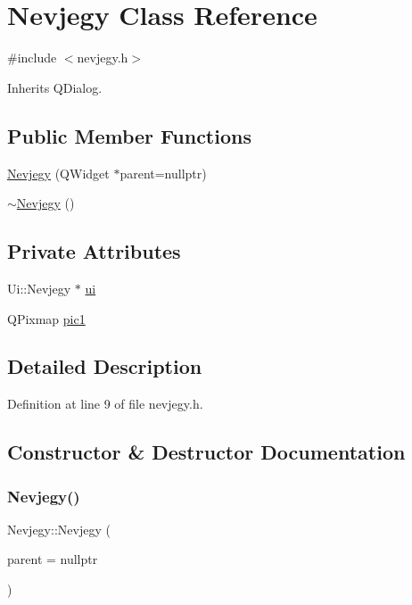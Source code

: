 \hypertarget{classNevjegy}{}\section{Nevjegy Class Reference}
\label{classNevjegy}


{\ttfamily \#include $<$nevjegy.\+h$>$}



Inherits Q\+Dialog.

\subsection*{Public Member Functions}
\begin{DoxyCompactItemize}
\item 
\hyperlink{classNevjegy_abd3f15b023f39e48ef5d79c384bea1d1}{Nevjegy} (Q\+Widget $\ast$parent=nullptr)
\item 
\hyperlink{classNevjegy_a9521f7b858472228b5b8d39438b67432}{$\sim$\+Nevjegy} ()
\end{DoxyCompactItemize}
\subsection*{Private Attributes}
\begin{DoxyCompactItemize}
\item 
Ui\+::\+Nevjegy $\ast$ \hyperlink{classNevjegy_ad971d94faab06f49928fb7f0b844105f}{ui}
\item 
Q\+Pixmap \hyperlink{classNevjegy_a4d025918cbecfe2da5184b98e63501df}{pic1}
\end{DoxyCompactItemize}


\subsection{Detailed Description}


Definition at line 9 of file nevjegy.\+h.



\subsection{Constructor \& Destructor Documentation}
\mbox{\label{classNevjegy_abd3f15b023f39e48ef5d79c384bea1d1}} 
\subsubsection{\texorpdfstring{Nevjegy()}{Nevjegy()}}
{\footnotesize\ttfamily Nevjegy\+::\+Nevjegy (\begin{DoxyParamCaption}\item[{Q\+Widget $\ast$}]{parent = {\ttfamily nullptr} }\end{DoxyParamCaption})\hspace{0.3cm}{\ttfamily [explicit]}}



